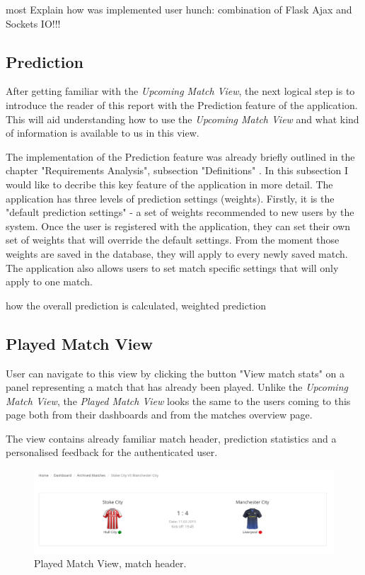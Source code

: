 most Explain how was implemented user hunch: combination of Flask Ajax and Sockets IO!!!
 
\subsection{Prediction}
\label{subsec:predictionimplementation}
After getting familiar with the \emph{Upcoming Match View}, the next logical step is to introduce the reader of this report with the Prediction feature of the application. This will aid understanding how to use the \emph{Upcoming Match View} and what kind of information is available to us in this view.

The implementation of the Prediction feature was already briefly outlined in the chapter "Requirements Analysis", subsection "Definitions" \cite{subsec:definitions}. In this subsection I would like to decribe this key feature of the application in more detail. The application has three levels of prediction settings (weights). Firstly, it is the "default prediction settings" - a set of weights recommended to new users by the system. Once the user is registered with the application, they can set their own set of weights that will override the default settings. From the moment those weights are saved in the database, they will apply to every newly saved match. The application also allows users to set match specific settings that will only apply to one match. 
 


how the overall prediction is calculated, weighted prediction

\subsection{Played Match View}
\label{subsec:playedmatchview}
User can navigate to this view by clicking the button "View match stats" on a panel representing a match that has already been played. Unlike the \emph{Upcoming Match View}, the \emph{Played Match View} looks the same to the users coming to this page both from their dashboards and from the matches overview page. 

The view contains already familiar match header, prediction statistics and a personalised feedback for the authenticated user. 

\begin{figure}[H]
	\begin{center}
		\includegraphics[width=.90\linewidth,natwidth=610,natheight=642]{impl/images/matchHeader}
		\caption{Played Match View, match header.} \label{fig:matchheader}
	\end{center}
\end{figure}

